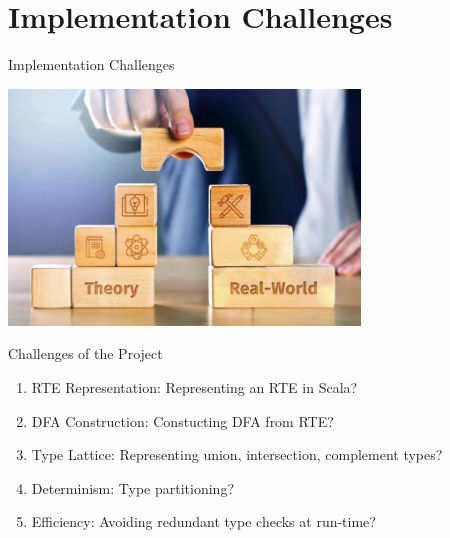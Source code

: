 \section{Implementation Challenges}

{  
  \begin{frame}{Implementation Challenges}
      
  \centering
  \includegraphics[width=0.7\textwidth]{theoretic-challenge.png}
\end{frame}
}

\begin{frame}{Challenges of the Project}
  \begin{enumerate}
  \item RTE Representation:   Representing an RTE in Scala?
  \item DFA Construction:  Constucting DFA from RTE?
  \item Type Lattice: Representing union, intersection, complement types?
  \item Determinism: Type partitioning?
  \item Efficiency:  Avoiding redundant type checks at run-time?
  \end{enumerate}
\end{frame}
